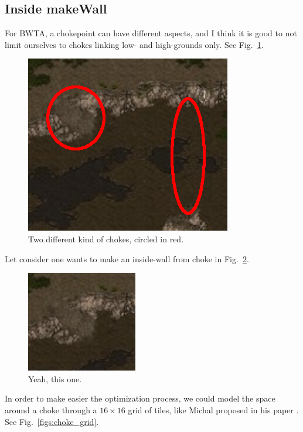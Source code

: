 \documentclass[a4paper,11pt]{article}
\begin{document}
\subsection{Inside makeWall}

For BWTA, a  chokepoint can have different aspects, and  I think it is
good to  not limit ourselves  to chokes linking low-  and high-grounds
only. See Fig.~\ref{figs:chokes}.

\begin{figure}[!ht]
  \centering
  \includegraphics[width=.6\linewidth]{figs/chokes_circled}
  \caption{Two different kind of chokes, circled in red.}
  \label{figs:chokes}
\end{figure}

Let  consider  one  wants  to   make  an  inside-wall  from  choke  in
Fig.~\ref{figs:choke_alone}.

\begin{figure}[!ht]
  \centering
  \includegraphics[width=.4\linewidth]{figs/choke_alone}
  \caption{Yeah, this one.}
  \label{figs:choke_alone}
\end{figure}

In order to  make easier the optimization process,  we could model the
space around  a choke  through a  $16 \times 16$  grid of  tiles, like
Michal proposed in his paper . See Fig.~\ref{figs:choke_grid}.
\end{document}
